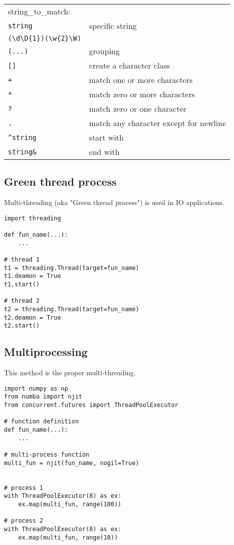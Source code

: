 \begin{tabular}{@{}ll@{}}
    string\_to\_match: \\
    \verb!string!    & specific string \\
    \verb!(\d\D{1})(\w{2}\W)!    &  \\
    \verb!(...)!    & grouping \\
    \verb![]!    & create a character class \\
    \verb!+!    & match one or more characters \\
    \verb!*!    & match zero or more characters \\
    \verb!?!    & match zero or one character \\
    \verb!.!    & match any character except for newline \\
    \verb!^string!    & start with \\
    \verb!string&!    & end with \\
\end{tabular}








\subsection{Green thread process}
Multi-threading (aka "Green thread process") is used in IO applications.

\begin{verbatim}
import threading

def fun_name(...):
    ...

# thread 1
t1 = threading.Thread(target=fun_name)
t1.deamon = True
t1.start()

# thread 2
t2 = threading.Thread(target=fun_name)
t2.deamon = True
t2.start()
\end{verbatim}
        

        


\subsection{Multiprocessing}
This method is the proper multi-threading.

\begin{verbatim}
import numpy as np
from numba import njit
from concurrent.futures import ThreadPoolExecutor

# function definition
def fun_name(...):
    ...

# multi-process function
multi_fun = njit(fun_name, nogil=True)


# process 1
with ThreadPoolExecutor(8) as ex:
    ex.map(multi_fun, range(100))

# process 2
with ThreadPoolExecutor(8) as ex:
    ex.map(multi_fun, range(10))
\end{verbatim}




